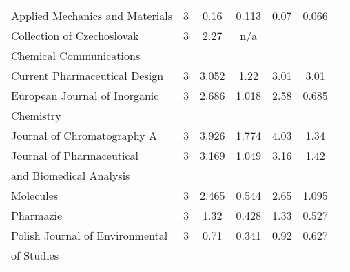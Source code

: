 \begin{longtable}[c]{lcccrcc}
  Applied Mechanics and Materials                                                    & 3      & 0.16    & 0.113 &  0.07      & 0.066                 \\[0.5ex]
  Collection of Czechoslovak                                                         & 3      & 2.27    & n/a   &            &                       \\[0.5ex]
 Chemical Communications                                                            &        &         &       &            &                       \\[0.5ex]
 Current Pharmaceutical Design                                                      & 3      & 3.052   & 1.22  &  3.01      & 3.01                  \\[0.5ex]
 European Journal of Inorganic                                                      & 3      & 2.686   & 1.018 &  2.58      & 0.685                 \\[0.5ex]
 Chemistry                                                                          &        &         &       &            &                       \\[0.5ex]
 Journal of Chromatography A                                                        & 3      & 3.926   & 1.774 &  4.03      & 1.34                  \\[0.5ex]
 Journal of Pharmaceutical                                                          & 3      & 3.169   & 1.049 &  3.16      & 1.42                  \\[0.5ex]
 and Biomedical Analysis                                                            &        &         &       &            &                       \\[0.5ex]
 Molecules                                                                          & 3      & 2.465   & 0.544 &  2.65      & 1.095                 \\[0.5ex]
 Pharmazie                                                                          & 3      & 1.32    & 0.428 &  1.33      & 0.527                 \\[0.5ex]
 Polish Journal of Environmental                                                    & 3      & 0.71    & 0.341 &  0.92      & 0.627                 \\[0.5ex]
 of Studies                                                                         &        &         &       &            &                       \\[0.5ex]

\end{longtable}
